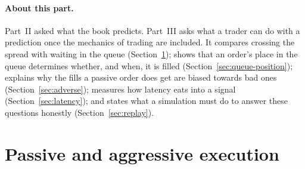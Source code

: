 \paragraph{About this part.} Part~II asked what the book predicts. Part~III asks what a trader can do
with a prediction once the mechanics of trading are included. It compares crossing the spread with
waiting in the queue (Section~\ref{sec:passive}); shows that an order's place in the queue determines
whether, and when, it is filled (Section~\ref{sec:queue-position}); explains why the fills a passive
order does get are biased towards bad ones (Section~\ref{sec:adverse}); measures how latency eats into a
signal (Section~\ref{sec:latency}); and states what a simulation must do to answer these questions
honestly (Section~\ref{sec:replay}).

\section{Passive and aggressive execution}
\label{sec:passive}

